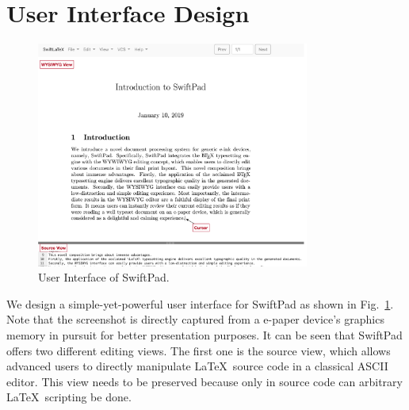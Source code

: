 \documentclass[]{sigchi}
\begin{document}
\section{User Interface Design}\label{sect:htmleditor}

\begin{figure}[t]
\begin{center}
\includegraphics[width=0.8\textwidth]{figures/UIscreenshot}
\caption{User Interface of SwiftPad. }
\label{fig:uisc}
\end{center}
\end{figure}
We design a simple-yet-powerful user interface for SwiftPad as shown in Fig.~\ref{fig:uisc}. Note that the screenshot is directly captured from a e-paper device's graphics memory in pursuit for better presentation purposes. It can be seen that SwiftPad offers two different editing views. 
The first one is the source view, which allows advanced users to directly manipulate \LaTeX\ source code in a classical ASCII editor.
This view needs to be preserved because only in source code can arbitrary \LaTeX\ scripting be done. 

\end{document}

